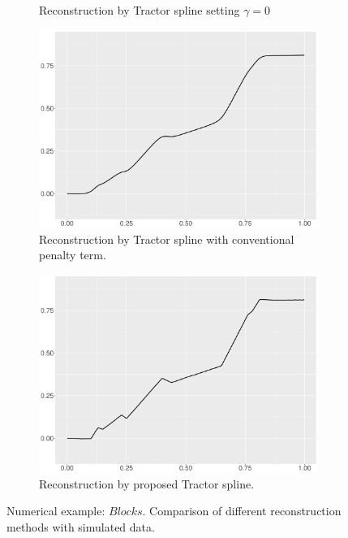 \begin{figure}
\begin{subfigure}{0.45\textwidth}
    \caption{Reconstruction by Tractor spline setting $\gamma=0$}
    \end{subfigure}
  \begin{subfigure}{0.45\textwidth}
    \centering
    \includegraphics[width=\linewidth,height=0.45\textwidth]{Chapters/02TractorSplineTheory/plot/ggplot/ggBlocksTractorAPT.pdf}
    \caption{Reconstruction by Tractor spline with conventional penalty term.}
    \end{subfigure}
    \begin{subfigure}{0.45\textwidth}
    \centering
    \includegraphics[width=\linewidth,height=0.45\textwidth]{Chapters/02TractorSplineTheory/plot/ggplot/ggBlocksTractor.pdf}
    \caption{Reconstruction by proposed Tractor spline.}
    \end{subfigure}
\caption{Numerical example: $\textit{Blocks}$. Comparison of different reconstruction methods with simulated data.}\label{num1}
 \end{figure}

%


